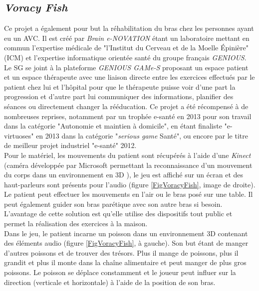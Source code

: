 	\subsection*{\textit{Voracy Fish} \cite{VoracyFish}}%
		Ce projet a également pour but la réhabilitation du bras chez les personnes ayant eu un AVC. Il est créé par \textit{Brain  e-NOVATION} \cite{BrainENOVATION} étant un laboratoire mettant en commun l'expertise médicale de "l'Institut du Cerveau et de la Moelle Épinière" (ICM) et l'expertise informatique orientée santé du groupe français \textit{GENIOUS}. Le SG se joint à la plateforme \textit{GENIOUS GAMe-S} proposant un espace patient et un espace thérapeute avec une liaison directe entre les exercices effectués par le patient chez lui et l'hôpital pour que le thérapeute puisse voir d'une part la progression et d'autre part lui communiquer des informations, planifier des séances ou directement changer la rééducation. Ce projet a été récompensé à de nombreuses reprises, notamment par un trophée e-santé en 2013 pour son travail dans la catégorie "Autonomie et maintien à domicile", en étant finaliste "e-virtuoses" en 2013 dans la catégorie "\textit{serious game} Santé", ou encore par le titre de meilleur projet industriel "e-santé" 2012.
		\\
		
		Pour le matériel, les mouvements du patient sont récupérés à l'aide d'une \textit{Kinect} (caméra développée par Microsoft permettant la reconnaissance d'un mouvement du corps dans un environnement en 3D \cite{Kinect_website}), le jeu est affiché sur un écran et des haut-parleurs sont présents pour l'audio (figure \ref{FigVoracyFish}, image de droite). Le patient peut effectuer les mouvements en l'air ou le bras posé sur une table. Il peut également guider son bras parétique avec son autre bras si besoin. L'avantage de cette solution est qu'elle utilise des dispositifs tout public et permet la réalisation des exercices à la maison.
		\\
		
		Dans le jeu, le patient incarne un poisson dans un environnement 3D contenant des éléments audio (figure \ref{FigVoracyFish}, à gauche). Son but étant de manger d'autres poissons et de trouver des trésors. Plus il mange de poissons, plus il grandit et plus il monte dans la chaîne alimentaire et peut manger de plus gros poissons. Le poisson se déplace constamment et le joueur peut influer sur la direction (verticale et horizontale) à l'aide de la position de son bras.
		\\
		
